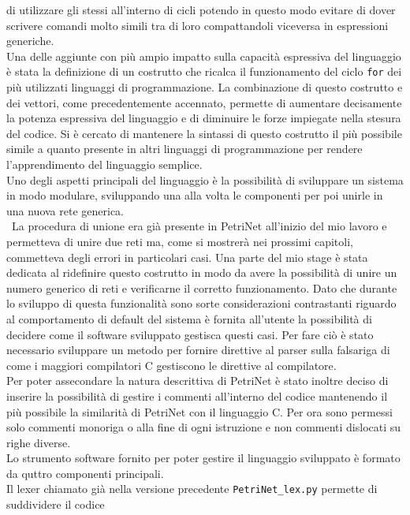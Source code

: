 \documentclass[italian,12pt]{book}
\begin{document}
 di utilizzare gli stessi all'interno di cicli potendo in questo modo evitare di dover scrivere 
 comandi molto simili tra di loro compattandoli viceversa in espressioni generiche. \\
 Una delle aggiunte con più ampio impatto sulla capacità espressiva del linguaggio
  è stata la definizione di un costrutto che ricalca 
 il funzionamento del ciclo {\tt for} dei più utilizzati linguaggi di programmazione. La combinazione 
 di questo costrutto e dei vettori, come precedentemente accennato, permette di aumentare 
 decisamente la potenza espressiva del linguaggio e di diminuire le forze impiegate nella 
 stesura del codice. Si è cercato di mantenere la sintassi di questo costrutto il più possibile simile
 a quanto presente in altri linguaggi di programmazione per rendere l'apprendimento del linguaggio
 semplice. \\
 Uno degli aspetti principali del linguaggio è la possibilità di sviluppare un sistema 
 in modo modulare, sviluppando una alla volta le componenti per poi unirle in una nuova 
 rete generica. \\\
 La procedura di unione era già presente in PetriNet all'inizio del mio lavoro e permetteva di unire due 
 reti ma, come si mostrerà nei prossimi capitoli, commetteva degli errori in particolari casi. Una
 parte del mio stage è stata dedicata al ridefinire questo costrutto in modo da avere la possibilità di 
 unire un numero generico di reti e verificarne il corretto funzionamento. Dato che durante lo sviluppo di
 questa funzionalità sono sorte considerazioni contrastanti riguardo al comportamento di default 
 del sistema è fornita all'utente la possibilità di decidere come il software sviluppato gestisca questi casi.
 Per fare ciò è stato necessario sviluppare un metodo per fornire direttive al parser sulla falsariga 
 di come i maggiori compilatori C gestiscono le direttive al compilatore. \\
 Per poter assecondare la natura descrittiva di PetriNet è stato inoltre deciso di inserire la possibilità di 
 gestire i commenti all'interno del codice mantenendo il più possibile la similarità di PetriNet con 
 il linguaggio C. Per ora sono permessi solo commenti monoriga o alla fine di ogni istruzione e non 
 commenti dislocati su righe diverse. \\
 Lo strumento software fornito per poter gestire il linguaggio sviluppato è formato da quttro componenti
 principali. \\
 Il lexer chiamato già nella versione precedente {\tt PetriNet\_lex.py} permette di suddividere il codice 
\end{document}
